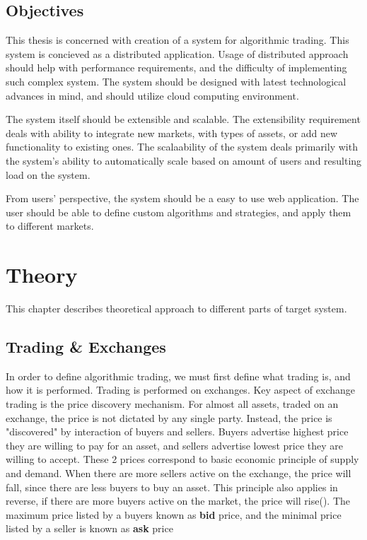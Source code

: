 \section{Objectives}
This thesis is concerned with creation of a system for algorithmic trading. This system is concieved
as a distributed application. Usage of distributed approach should help with performance requirements,
and the difficulty of implementing such complex system. The system should be designed with latest technological advances in mind, and
should utilize cloud computing environment.


The system itself should be extensible and scalable. The extensibility requirement deals with ability to integrate new markets,
with types of assets, or add new functionality to existing ones. The scalaability of the system deals primarily with the system's
ability to automatically scale based on amount of users and resulting load on the system.


From users' perspective, the system should be a easy to use web application. The user should be able to define custom
algorithms and strategies, and apply them to different markets.


\todo{}

\chapter{Theory}
\label{theory}
This chapter describes theoretical approach to different parts of target system.
\section{Trading \& Exchanges}
In order to define algorithmic trading, we must first define what trading is, and how it is performed.
Trading is performed on exchanges. Key aspect of exchange trading is the price discovery mechanism. For almost all assets,
traded on an exchange, the price is not dictated by any single party. Instead, the price is "discovered" by interaction of
buyers and sellers. Buyers advertise highest price they are willing to pay for an asset, and sellers advertise lowest price
they are willing to accept. These 2 prices correspond to basic economic principle of supply and demand. When there are more sellers active
on the exchange, the price will fall, since there are less buyers to buy an asset. This principle also applies in reverse, if there are more
buyers active on the market, the price will rise().
The maximum price listed by a buyers known as \textbf{bid} price, and the minimal price listed by a seller is known as \textbf{ask} price


